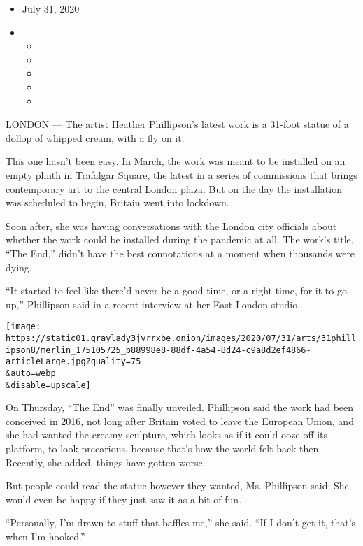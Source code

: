 \begin{itemize}
\item
  July 31, 2020
\item
  \begin{itemize}
  \item
  \item
  \item
  \item
  \item
  \end{itemize}
\end{itemize}

LONDON --- The artist Heather Phillipson's latest work is a 31-foot
statue of a dollop of whipped cream, with a fly on it.

This one hasn't been easy. In March, the work was meant to be installed
on an empty plinth in Trafalgar Square, the latest in
\href{https://www.nytimes3xbfgragh.onion/2017/01/19/arts/design/london-fourth-plinth-art.html}{a
series of commissions} that brings contemporary art to the central
London plaza. But on the day the installation was scheduled to begin,
Britain went into lockdown.

Soon after, she was having conversations with the London city officials
about whether the work could be installed during the pandemic at all.
The work's title, ``The End,'' didn't have the best connotations at a
moment when thousands were dying.

``It started to feel like there'd never be a good time, or a right time,
for it to go up,'' Phillipson said in a recent interview at her East
London studio.

\texttt{[image: https://static01.graylady3jvrrxbe.onion/images/2020/07/31/arts/31phillipson8/merlin\_175105725\_b88998e8-88df-4a54-8d24-c9a8d2ef4866-articleLarge.jpg?quality=75\\\&auto=webp\\\&disable=upscale]}

On Thursday, ``The End'' was finally unveiled. Phillipson said the work
had been conceived in 2016, not long after Britain voted to leave the
European Union, and she had wanted the creamy sculpture, which looks as
if it could ooze off its platform, to look precarious, because that's
how the world felt back then. Recently, she added, things have gotten
worse.

But people could read the statue however they wanted, Ms. Phillipson
said: She would even be happy if they just saw it as a bit of fun.

``Personally, I'm drawn to stuff that baffles me,'' she said. ``If I
don't get it, that's when I'm hooked.''

